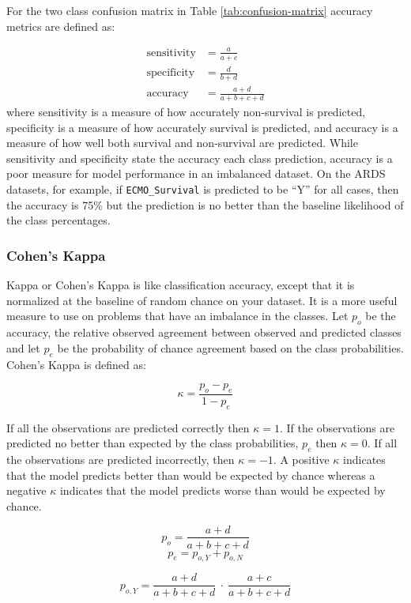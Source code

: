 \documentclass[12pt,]{article}
\begin{document}
For the two class confusion matrix in Table \ref{tab:confusion-matrix}
accuracy metrics are defined as:

\[
\begin{aligned}
\text{sensitivity} &= \frac{a}{a+c} \\
\text{specificity} &= \frac{d}{b+d} \\
\text{accuracy} &= \frac{a+d}{a+b+c+d}
\end{aligned}
\] where sensitivity is a measure of how accurately non-survival is
predicted, specificity is a measure of how accurately survival is
predicted, and accuracy is a measure of how well both survival and
non-survival are predicted. While sensitivity and specificity state the
accuracy each class prediction, accuracy is a poor measure for model
performance in an imbalanced dataset. On the ARDS datasets, for example,
if \texttt{ECMO\_Survival} is predicted to be ``Y'' for all cases, then
the accuracy is 75\% but the prediction is no better than the baseline
likelihood of the class percentages.

\subsubsection{Cohen's Kappa}\label{cohens-kappa}

Kappa or Cohen's Kappa is like classification accuracy, except that it
is normalized at the baseline of random chance on your dataset. It is a
more useful measure to use on problems that have an imbalance in the
classes. Let \(p_o\) be the accuracy, the relative observed agreement
between observed and predicted classes and let \(p_e\) be the
probability of chance agreement based on the class probabilities.
Cohen's Kappa is defined as:

\[
\kappa = \frac{p_o - p_e}{1 - p_e}
\]

If all the observations are predicted correctly then \(\kappa=1\). If
the observations are predicted no better than expected by the class
probabilities, \(p_e\) then \(\kappa=0\). If all the observations are
predicted incorrectly, then \(\kappa=-1\). A positive \(\kappa\)
indicates that the model predicts better than would be expected by
chance whereas a negative \(\kappa\) indicates that the model predicts
worse than would be expected by chance.

\[
p_o = \frac{a+d}{a+b+c+d}
\] \[
p_e = p_{o,Y} + p_{o,N} 
\]

\[
p_{o,Y} = \frac{a+d}{a+b+c+d} ~\cdot~ \frac{a+c}{a+b+c+d}
\]
\end{document}
